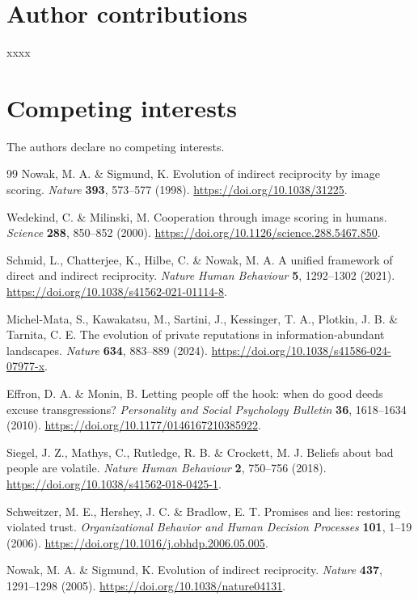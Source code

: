\documentclass[fleqn,10pt]{wlscirep}
\begin{document}
\section*{Author contributions}
xxxx

\section*{Competing interests}
The authors declare no competing interests.

\begin{thebibliography}{99}
Nowak, M. A. \& Sigmund, K.
Evolution of indirect reciprocity by image scoring.
\textit{Nature} \textbf{393}, 573--577 (1998).
\url{https://doi.org/10.1038/31225}.

Wedekind, C. \& Milinski, M.
Cooperation through image scoring in humans.
\textit{Science} \textbf{288}, 850--852 (2000).
\url{https://doi.org/10.1126/science.288.5467.850}.

Schmid, L., Chatterjee, K., Hilbe, C. \& Nowak, M. A.
A unified framework of direct and indirect reciprocity.
\textit{Nature Human Behaviour} \textbf{5}, 1292--1302 (2021).
\url{https://doi.org/10.1038/s41562-021-01114-8}.

Michel-Mata, S., Kawakatsu, M., Sartini, J., Kessinger, T. A.,
Plotkin, J. B. \& Tarnita, C. E.
The evolution of private reputations in information-abundant landscapes.
\textit{Nature} \textbf{634}, 883--889 (2024).
\url{https://doi.org/10.1038/s41586-024-07977-x}.

Effron, D. A. \& Monin, B.
Letting people off the hook: when do good deeds excuse transgressions?
\textit{Personality and Social Psychology Bulletin} \textbf{36}, 1618--1634 (2010).
\url{https://doi.org/10.1177/0146167210385922}.

Siegel, J. Z., Mathys, C., Rutledge, R. B. \& Crockett, M. J.
Beliefs about bad people are volatile.
\textit{Nature Human Behaviour} \textbf{2}, 750--756 (2018).
\url{https://doi.org/10.1038/s41562-018-0425-1}.

Schweitzer, M. E., Hershey, J. C. \& Bradlow, E. T.
Promises and lies: restoring violated trust.
\textit{Organizational Behavior and Human Decision Processes} \textbf{101}, 1--19 (2006).
\url{https://doi.org/10.1016/j.obhdp.2006.05.005}.

Nowak, M. A. \& Sigmund, K.
Evolution of indirect reciprocity.
\textit{Nature} \textbf{437}, 1291--1298 (2005).
\url{https://doi.org/10.1038/nature04131}.


\end{thebibliography}
\end{document}
